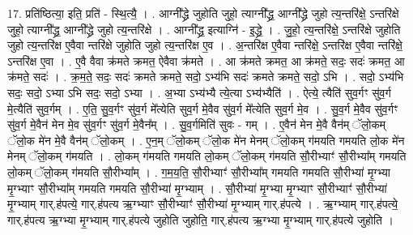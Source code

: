 \documentclass[17pt]{extarticle}
\begin{document}
17. प्रति॑ष्ठित्या॒ इति॒ प्रति॑ - स्थि॒त्यै॒ । . आग्नी᳚द्ध्रे जुहोति जुहो॒ त्याग्नी᳚द्ध्र॒ आग्नी᳚द्ध्रे जुहो त्य॒न्तरि॑क्षे॒ ऽन्तरि॑क्षे जुहो॒ त्याग्नी᳚द्ध्र॒ आग्नी᳚द्ध्रे जुहो
त्य॒न्तरि॑क्षे । . आग्नी᳚द्ध्र॒ इत्याग्नि॑ - इ॒द्ध्रे॒ । . जु॒हो॒ त्य॒न्तरि॑क्षे॒ ऽन्तरि॑क्षे जुहोति जुहो त्य॒न्तरि॑क्ष ए॒वैवा न्तरि॑क्षे जुहोति जुहो त्य॒न्तरि॑क्ष ए॒व । . अ॒न्तरि॑क्ष ए॒वैवा न्तरि॑क्षे॒ ऽन्तरि॑क्ष ए॒वैवा न्तरि॑क्षे॒ ऽन्तरि॑क्ष ए॒वा । . ए॒वै वैवा क्र॑मते क्रमत॒ ऐवैवा क्र॑मते । . आ क्र॑मते क्रमत॒ आ क्र॑मते॒ सदः॒ सदः॑ क्रमत॒ आ क्र॑मते॒ सदः॑ । . क्र॒म॒ते॒ सदः॒ सदः॑ क्रमते क्रमते॒ सदो॒ ऽभ्य॑भि सदः॑ क्रमते क्रमते॒ सदो॒ ऽभि । . सदो॒ ऽभ्य॑भि सदः॒ सदो॒ ऽभ्या ऽभि सदः॒ सदो॒ ऽभ्या । . अ॒भ्या ऽभ्य॑भ्यै त्ये॒त्या ऽभ्य॑भ्यैति॑ । . ऐत्ये॒ त्यैति॑ सुव॒र्गꣳ सु॑व॒र्ग मे॒त्यैति॑ सुव॒र्गम् । . ए॒ति॒ सु॒व॒र्गꣳ सु॑व॒र्ग मे᳚त्येति सुव॒र्ग मे॒वैव सु॑व॒र्ग मे᳚त्येति सुव॒र्ग मे॒व । . सु॒व॒र्ग मे॒वैव सु॑व॒र्गꣳ सु॑व॒र्ग मे॒वैन॑ मेन मे॒व सु॑व॒र्गꣳ सु॑व॒र्ग मे॒वैन᳚म् । . सु॒व॒र्गमिति॑ सुवः - गम् । . ए॒वैन॑ मेन मे॒वै वैन॑म् ॅलो॒कम् ॅलो॒क मे॑न मे॒वै वैन॑म् ॅलो॒कम् । . ए॒न॒म् ॅलो॒कम् ॅलो॒क मे॑न मेनम् ॅलो॒कम् ग॑मयति गमयति लो॒क मे॑न मेनम् ॅलो॒कम् ग॑मयति । . लो॒कम् ग॑मयति गमयति लो॒कम् ॅलो॒कम् ग॑मयति सौ॒रीभ्याꣳ॑ सौ॒रीभ्या᳚म् गमयति लो॒कम् ॅलो॒कम् ग॑मयति सौ॒रीभ्या᳚म् । . ग॒म॒य॒ति॒ सौ॒रीभ्याꣳ॑ सौ॒रीभ्या᳚म् गमयति गमयति सौ॒रीभ्या॑ मृ॒ग्भ्या मृ॒ग्भ्याꣳ सौ॒रीभ्या᳚म् गमयति गमयति सौ॒रीभ्या॑ मृ॒ग्भ्याम् । . सौ॒रीभ्या॑ मृ॒ग्भ्या मृ॒ग्भ्याꣳ सौ॒रीभ्याꣳ॑ सौ॒रीभ्या॑ मृ॒ग्भ्याम् गार्.ह॑पत्ये॒ गार्.ह॑पत्य ऋ॒ग्भ्याꣳ सौ॒रीभ्याꣳ॑ सौ॒रीभ्या॑ मृ॒ग्भ्याम् गार्.ह॑पत्ये । . ऋ॒ग्भ्याम् गार्.ह॑पत्ये॒ गार्.ह॑पत्य ऋ॒ग्भ्या मृ॒ग्भ्याम् गार्.ह॑पत्ये जुहोति जुहोति॒ गार्.ह॑पत्य ऋ॒ग्भ्या मृ॒ग्भ्याम् गार्.ह॑पत्ये जुहोति । \newline
\end{document}
